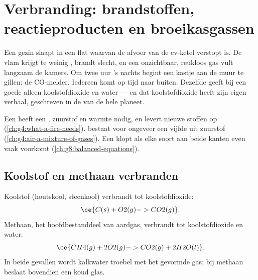 \chapter{Verbranding: brandstoffen, reactieproducten en broeikasgassen}\label{ch:g8:combustion-and-fuels}

Een gezin slaapt in een flat waarvan de afvoer van de cv-ketel verstopt
is. De vlam krijgt te weinig , brandt slecht, en een onzichtbaar,
reukloos gas vult langzaam de kamers. Om twee uur 's nachts begint een
kastje aan de muur te gillen: de CO-melder. Iedereen komt op tijd
naar buiten. Dezelfde  geeft bij een goede  alleen
koolstofdioxide en water --- en dat koolstofdioxide heeft zijn eigen
verhaal, geschreven in de  van de hele planeet.

\begin{recall}
Een  heeft een , zuurstof en warmte nodig, en levert
nieuwe stoffen op (\cref{ch:g4:what-a-fire-needs}).  bestaat voor
ongeveer een vijfde uit zuurstof (\cref{ch:g4:air-a-mixture-of-gases}).
Een  klopt als elke soort  aan beide kanten even
vaak voorkomt (\cref{ch:g8:balanced-equations}).
\end{recall}

\section{Koolstof en methaan verbranden}

\begin{example}\label{ex:g8:combustion-and-fuels:two}
Koolstof (houtskool, steenkool) verbrandt tot koolstofdioxide:
\[
  \ce{C(s) + O2(g) -> CO2(g)}.
\]
Methaan, het hoofdbestanddeel van aardgas, verbrandt tot koolstofdioxide
en water:
\[
  \ce{CH4(g) + 2O2(g) -> CO2(g) + 2H2O(l)}.
\]
In beide gevallen wordt kalkwater troebel met het gevormde gas; bij
methaan beslaat bovendien een koud glas.
\end{example}

